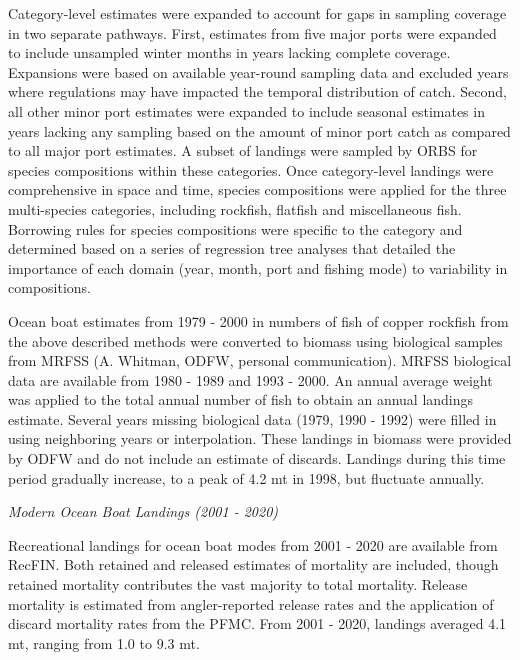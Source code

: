 \documentclass[11pt,
  english,
  a4paper,
]{article}
\begin{document}
Category-level estimates were expanded to account for gaps in sampling coverage in two separate pathways. First, estimates from five major ports were expanded to include unsampled winter months in years lacking complete coverage. Expansions were based on available year-round sampling data and excluded years where regulations may have impacted the temporal distribution of catch. Second, all other minor port estimates were expanded to include seasonal estimates in years lacking any sampling based on the amount of minor port catch as compared to all major port estimates. A subset of landings were sampled by ORBS for species compositions within these categories. Once category-level landings were comprehensive in space and time, species compositions were applied for the three multi-species categories, including rockfish, flatfish and miscellaneous fish. Borrowing rules for species compositions were specific to the category and determined based on a series of regression tree analyses that detailed the importance of each domain (year, month, port and fishing mode) to variability in compositions.

\leavevmode\tagmcend\tagstructend\par


Ocean boat estimates from 1979 - 2000 in numbers of fish of copper rockfish from the above described methods were converted to biomass using biological samples from MRFSS (A. Whitman, ODFW, personal communication). MRFSS biological data are available from 1980 - 1989 and 1993 - 2000. An annual average weight was applied to the total annual number of fish to obtain an annual landings estimate. Several years missing biological data (1979, 1990 - 1992) were filled in using neighboring years or interpolation. These landings in biomass were provided by ODFW and do not include an estimate of discards. Landings during this time period gradually increase, to a peak of 4.2 mt in 1998, but fluctuate annually.

\leavevmode\tagmcend\tagstructend\par


\emph{Modern Ocean Boat Landings (2001 - 2020)}

\leavevmode\tagmcend\tagstructend\par


Recreational landings for ocean boat modes from 2001 - 2020 are available from RecFIN. Both retained and released estimates of mortality are included, though retained mortality contributes the vast majority to total mortality. Release mortality is estimated from angler-reported release rates and the application of discard mortality rates from the PFMC. From 2001 - 2020, landings averaged 4.1 mt, ranging from 1.0 to 9.3 mt.
\end{document}

